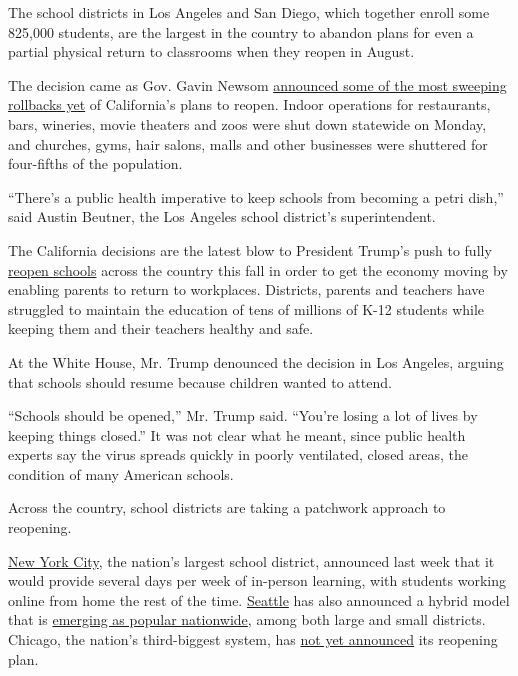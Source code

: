 The school districts in Los Angeles and San Diego, which together enroll
some 825,000 students, are the largest in the country to abandon plans
for even a partial physical return to classrooms when they reopen in
August.

The decision came as Gov. Gavin Newsom
\href{https://twitter.com/GavinNewsom/status/1282752861835649024?s=20}{announced
some of the most sweeping rollbacks yet} of California's plans to
reopen. Indoor operations for restaurants, bars, wineries, movie
theaters and zoos were shut down statewide on Monday, and churches,
gyms, hair salons, malls and other businesses were shuttered for
four-fifths of the population.

``There's a public health imperative to keep schools from becoming a
petri dish,'' said Austin Beutner, the Los Angeles school district's
superintendent.

The California decisions are the latest blow to President Trump's push
to fully
\href{https://www.nytimes3xbfgragh.onion/interactive/2020/07/31/us/coronavirus-school-reopening-risk.html}{reopen
schools} across the country this fall in order to get the economy moving
by enabling parents to return to workplaces. Districts, parents and
teachers have struggled to maintain the education of tens of millions of
K-12 students while keeping them and their teachers healthy and safe.

At the White House, Mr. Trump denounced the decision in Los Angeles,
arguing that schools should resume because children wanted to attend.

``Schools should be opened,'' Mr. Trump said. ``You're losing a lot of
lives by keeping things closed.'' It was not clear what he meant, since
public health experts say the virus spreads quickly in poorly
ventilated, closed areas, the condition of many American schools.

Across the country, school districts are taking a patchwork approach to
reopening.

\href{https://www.nytimes3xbfgragh.onion/2020/07/08/nyregion/nyc-schools-reopening-plan.html}{New
York City}, the nation's largest school district, announced last week
that it would provide several days per week of in-person learning, with
students working online from home the rest of the time.
\href{https://www.seattleschools.org/district/calendars/news/what_s_new/coronavirus_update}{Seattle}
has also announced a hybrid model that is
\href{https://www.nytimes3xbfgragh.onion/2020/06/26/us/coronavirus-schools-reopen-fall.html}{emerging
as popular nationwide}, among both large and small districts. Chicago,
the nation's third-biggest system, has
\href{https://chicago.chalkbeat.org/2020/7/9/21319042/six-things-to-watch-as-chicago-weighs-reopening-school-buildings-this-fall}{not
yet announced} its reopening plan.

